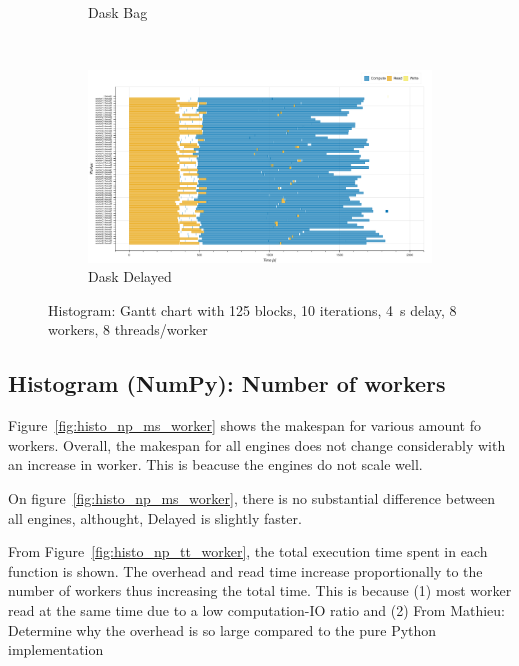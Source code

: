 \documentclass[conference]{IEEEtran}
\newcommand{\MD}[1]{\color{magenta}From Mathieu: #1 \color{black}}
\begin{document}
\begin{figure}[!htb]
\begin{subfigure}[b]{\columnwidth}
        \caption{Dask Bag}\label{fig:histo_dask_bag_gantt}
    \end{subfigure}
    \\
    \begin{subfigure}[b]{\columnwidth}
        \includegraphics[clip,width=\columnwidth]{images/delayed_histo_gantt.png}%
        \caption{Dask Delayed}\label{fig:histo_dask_delayed_gantt}
    \end{subfigure}
    \caption{Histogram: Gantt chart with 125 blocks, 10 iterations, \SI{4}{\second}
delay, 8 workers, 8 threads/worker}\label{fig:histo_gantt}
\end{figure}

\subsection{Histogram (NumPy): Number of workers}
Figure~\ref{fig:histo_np_ms_worker} shows the makespan for various amount fo workers.
Overall, the makespan for all engines does not change considerably with an increase 
in worker. This is beacuse the engines do not scale well.

On figure~\ref{fig:histo_np_ms_worker}, there is no substantial difference between
 all engines, althought, Delayed is slightly faster.

From Figure~\ref{fig:histo_np_tt_worker}, the total execution time spent in each
function is shown. The overhead and read time increase proportionally to the number
of workers thus increasing the total time. This is because (1) most worker read at
the same time due to a low computation-IO ratio and (2) \MD{Determine why the
overhead is so large compared to the pure Python implementation}
\end{document}
